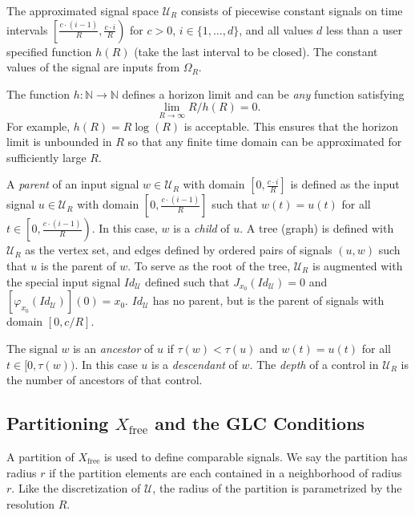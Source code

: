 \documentclass{llncs}
\newcommand{\GLC}{\ensuremath{\mathrm{GLC}}\xspace}
\begin{document}
The approximated signal space $\mathcal{U}_R$ consists of piecewise constant signals on time intervals $\left[\frac{c\cdot(i-1)}{R},\frac{c\cdot i}{R}\right)$ for $c>0$, $i\in\{1,...,d\}$, and all values $d$ less than a user specified function $h(R)$ (take the last interval to be closed). The constant values of the signal are inputs from $\Omega_R$.   

%
The function $h:\mathbb{N}\rightarrow\mathbb{N}$ defines a horizon limit and can be \textit{any} function satisfying
% 
\begin{equation}
\lim_{R\rightarrow\infty}R/h(R)=0.\label{eq:h_constraint}
\end{equation}
%
For example, $h(R)=R\log(R)$ is acceptable. 
%
This ensures that the horizon limit is unbounded in $R$ so that any finite time domain can be approximated for sufficiently large $R$.
%

%
A \textit{parent} of an input signal $w\in\mathcal{U}_{R}$ with domain $\left[0,\frac{c\cdot i}{R}\right]$ is defined as the input signal $u\in\mathcal{U}_{R}$ with domain $\left[0,\frac{c\cdot(i-1)}{R}\right]$ such that $w(t)=u(t)$ for all $t\in\left[0,\frac{c\cdot(i-1)}{R}\right)$.
%
In this case, $w$ is a \textit{child} of $u$. 
%
A tree (graph) is defined with $\mathcal{U}_{R}$ as the vertex set, and edges defined by ordered pairs of signals $(u,w)$ such that $u$ is the parent of $w$.
%
To serve as the root of the tree, $\mathcal{U}_R$ is augmented with the special input signal $Id_{\mathcal{U}}$ defined such that $J_{x_0}(Id_{\mathcal{U}})=0$ and $[\varphi_{x_0}(Id_\mathcal{U})](0)=x_0$. $Id_{\mathcal{U}}$ has no parent, but is the parent of signals with domain $[0,c/R]$. 
%

The signal $w$ is an \textit{ancestor} of $u$ if $\tau(w)<\tau(u)$ and $w(t)=u(t)$ for all $t\in[0,\tau(w))$.
%
In this case $u$ is a \textit{descendant} of $w$. The \textit{depth} of a control in $\mathcal{U}_{R}$ is the number of ancestors of that control.

\subsection{Partitioning $X_\mathrm{free}$ and the GLC Conditions}
\label{sec:glc_def}
%
%
A partition of $X_\mathrm{free}$ is used to define comparable signals. We say the partition has radius $r$ if the partition elements are each contained in a neighborhood of radius $r$.
%
Like the discretization of $\mathcal{U}$, the radius of the partition is parametrized by the resolution $R$. 
\end{document}
